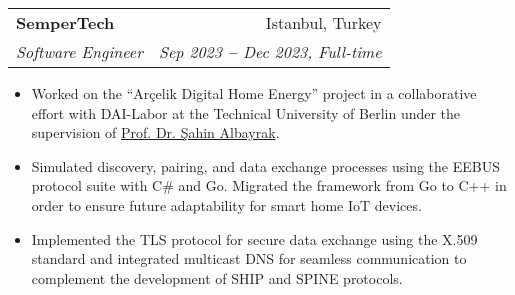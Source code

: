 \documentclass[letterpaper,11pt]{article}
\makeatletter
\newcommand{\resumeItem}[1]{
  \item\small{
    {#1 \vspace{-2pt}}
  }
}
\newcommand{\resumeSubheading}[4]{
  \vspace{-2pt}\item
    \begin{tabular*}{0.97\textwidth}[t]{l@{\extracolsep{\fill}}r}
      \textbf{#1} & #2 \\
      \textit{\small#3} & \textit{\small #4} \\
    \end{tabular*}\vspace{-7pt}
}
\newcommand{\resumeItemListStart}{\begin{itemize}}
\newcommand{\resumeItemListEnd}{\end{itemize}\vspace{-5pt}}
\makeatother
\begin{document}
    \resumeSubheading
      {SemperTech}{Istanbul, Turkey}
      {Software Engineer}{Sep 2023 \textbf{--} Dec 2023, Full-time}
        \resumeItemListStart
            \resumeItem{Worked on the “Arçelik Digital Home Energy” project in a collaborative effort with DAI-Labor at the Technical University of Berlin under the supervision of \href{https://www.linkedin.com/in/prof-dr-dr-h-c-sahin-albayrak-65452a1/}{\color{blue}Prof. Dr. Şahin Albayrak}.}
            \resumeItem{Simulated discovery, pairing, and data exchange processes using the EEBUS protocol suite with C\# and Go. Migrated the framework from Go to C++ in order to ensure future adaptability for smart home IoT devices.}
            \resumeItem{Implemented the TLS protocol for secure data exchange using the X.509 standard and integrated multicast DNS for seamless communication to complement the development of SHIP and SPINE protocols.}
        \resumeItemListEnd

\end{document}
